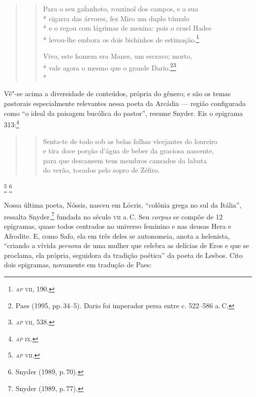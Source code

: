 \enlargethispage{1.3\baselineskip}
\begin{quote}
\begin{verse}
Para o seu gafanhoto, rouxinol dos campos, e a sua\\*
cigarra das árvores, fez Miro um duplo túmulo\\*
e o regou com lágrimas de menina: pois o cruel Hades\\*
levou-lhe embora os dois bichinhos de estimação.\footnote{\emph{\textsc{ap}} \textsc{vii}, 190.}\\

\medskip

Vivo, este homem era Manes, um escravo; morto,\\*
vale agora o mesmo que o grande Dario.\footnote{Paes (1995, pp.\,34--5). Dario foi imperador persa entre c. 522--586 a.\,C.}\footnote{\emph{\textsc{ap}} \textsc{vii}, 538.}\\*
\end{verse}
\end{quote} 

Vê"-se acima a diversidade de conteúdos, própria do gênero; e são os temas
pastorais especialmente relevantes nessa poeta da Arcádia --- região configurada
como “o ideal da paisagem bucólica do pastor”, resume Snyder. Eis o epigrama
313:\footnote{\emph{\textsc{ap}} \textsc{ix}.}

\begin{quote}
\begin{verse}

Senta-te de todo sob as belas folhas vicejantes do loureiro\\
e tira doce porção d’água de beber da graciosa nascente,\\
para que descansem teus membros cansados da labuta\\
do verão, tocados pelo sopro de Zéfiro.
\end{verse}
\end{quote}


\footnote{\emph{\textsc{ap}} \textsc{vii}.} \footnote{ Snyder (1989, p.\,70).} 

Nossa última poeta, Nóssis, nasceu em Lócris, “colônia grega no sul da Itália”,
ressalta Snyder,\footnote{Snyder (1989, p.\,77).} fundada no século \textsc{vii} a.\,C. Seu \emph{corpus} se
compõe de 12 epigramas, quase todos centrados no
universo feminino e nas deusas Hera e Afrodite. E, como Safo, ela em três deles
se autonomeia, anota a helenista, ``criando a vívida \emph{persona} de uma
mulher que celebra as delícias de Eros e que se proclama, ela própria,
seguidora da tradição poética'' da poeta de Lesbos. Cito dois epigramas,
novamente em tradução de Paes:

